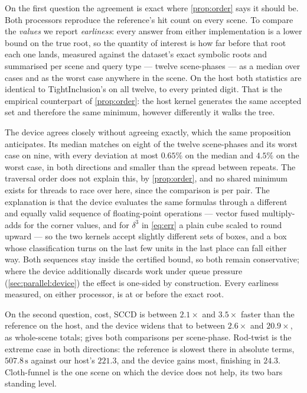On the first question the agreement is exact where \cref{prop:order} says it
should be. Both processors reproduce the reference's hit count on every scene. To
compare the \emph{values} we report \emph{earliness}: every answer from either
implementation is a lower bound on the true root, so the quantity of interest is
how far before that root each one lands, measured against the dataset's exact
symbolic roots and summarised per scene and query type --- twelve scene-phases
--- as a median over cases and as the worst case anywhere in the scene. On the
host both statistics are identical to TightInclusion's on all twelve, to every
printed digit. That is the empirical counterpart of \cref{prop:order}: the host
kernel generates the same accepted set and therefore the same minimum, however
differently it walks the tree.

The device agrees closely without agreeing exactly, which the same proposition
anticipates. Its median matches on eight of the twelve scene-phases and its worst
case on nine, with every deviation at most $0.65\%$ on the median and $4.5\%$ on
the worst case, in both directions and smaller than the spread between repeats.
The traversal order does not explain this, by \cref{prop:order}, and no shared
minimum exists for threads to race over here, since the comparison is per pair.
The explanation is that the device evaluates the same formulas through a
different and equally valid sequence of floating-point operations --- vector
fused multiply-adds for the corner values, and for $\delta^{3}$ in \cref{eq:err}
a plain cube scaled to round upward --- so the two kernels accept slightly
different sets of boxes, and a box whose classification turns on the last few
units in the last place can fall either way. Both sequences stay inside the
certified bound, so both remain conservative; where the device additionally
discards work under queue pressure (\cref{sec:parallel:device}) the effect is
one-sided by construction. Every earliness measured, on either processor, is at
or before the exact root.

On the second question, cost, SCCD is between $2.1\times$ and $3.5\times$ faster
than the reference on the host, and the device widens that to between
$2.6\times$ and $20.9\times$, as whole-scene totals; \supp{} gives both
comparisons per scene-phase. Rod-twist is the extreme case in both directions:
the reference is slowest there in absolute terms, $507.8\,\mathrm{s}$ against our
host's $221.3$, and the device gains most, finishing in $24.3$. Cloth-funnel is
the one scene on which the device does not help, its two bars standing level.

